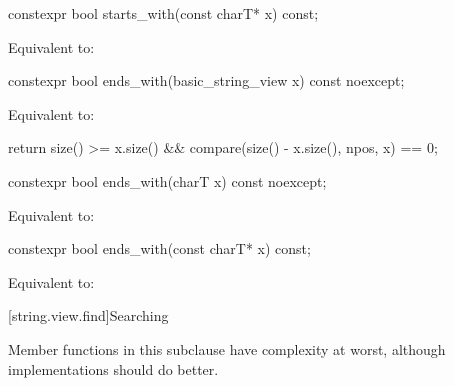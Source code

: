 %
\begin{itemdecl}
constexpr bool starts_with(const charT* x) const;
\end{itemdecl}

\begin{itemdescr}
\pnum
\effects
Equivalent to: 
\end{itemdescr}

%
\begin{itemdecl}
constexpr bool ends_with(basic_string_view x) const noexcept;
\end{itemdecl}

\begin{itemdescr}
\pnum
\effects
Equivalent to:
\begin{codeblock}
return size() >= x.size() && compare(size() - x.size(), npos, x) == 0;
\end{codeblock}
\end{itemdescr}

%
\begin{itemdecl}
constexpr bool ends_with(charT x) const noexcept;
\end{itemdecl}

\begin{itemdescr}
\pnum
\effects
Equivalent to: 
\end{itemdescr}

%
\begin{itemdecl}
constexpr bool ends_with(const charT* x) const;
\end{itemdecl}

\begin{itemdescr}
\pnum
\effects
Equivalent to: 
\end{itemdescr}

[string.view.find]{Searching}

\pnum
Member functions in this subclause have complexity  at worst,
although implementations should do better.


